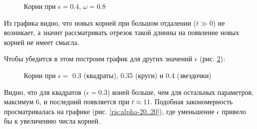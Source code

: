 \documentclass[14pt]{article}
\numberwithin{figure}{section}
\numberwithin{equation}{section}
\begin{document}
\begin{figure}[h]
	\caption{Корни при $\epsilon = 0.4$, $\omega = 0.8$}
	\label{ris:roots1}
\end{figure}

Из графика видно, что новых корней при большом отдалении ($t\gg0$) не возникает, а значит рассматривать отрезок такой длинны на появление новых корней не имеет смысла.

Чтобы убедится в этом построим график для других значений $\epsilon$ (рис. \ref{ris:roots2}):

\begin{figure}[h]
	\caption{Корни при $\epsilon = $ 0.3 (квадраты), 0.35 (круги) и 0.4 (звездочки) }
	\label{ris:roots2}
\end{figure}

Видно, что для квадратов ($\epsilon = 0.3$) коней больше, чем для остальных параметров, максимум 6, и последний появляется при $t \approx 11$. Подобная закономерность просматривалась на графике (рис. \ref{ris:alpha-20..20}), где уменьшение $\epsilon$ привело бы к увеличению числа корней.
\end{document}
